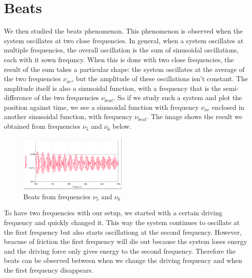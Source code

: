 \documentclass{article}
\begin{document}
\section{Beats}
We then studied the beats phenomenon. This phenomenon is observed when the system oscillates at two close frequencies. In general, when a system oscillates at multiple frequencies, the overall oscillation is the sum of sinusoidal oscillations, each with it sown frequncy. When this is done with two close frequencies, the result of the sum takes a particular shape: the system oscillates at the average of the two frequencies $\nu_{av}$, but the amplitude of these oscillations isn't constant. The amplitude itself is also a sinusoidal function, with a frequency that is the semi-difference of the two frequencies $\nu_{beat}$. So if we study such a system and plot the position against time, we see a sinusoidal function with frequency $\nu_{av}$ enclosed in another sinusoidal function, with frequency $\nu_{beat}$. The image shows the result we obtained from frequencies $\nu_5$ and $\nu_6$ below.

\begin{figure}
  \begin{center}
    \includegraphics[width=0.48\textwidth]{battimenti_vicino_fase}
  \end{center}
  \label{img:beat}
  \caption{Beats from frequencies  $\nu_5$ and $\nu_6$}
\end{figure}

To have two frequencies with our setup, we started with a certain driving frequency and quickly changed it. This way the system continues to oscillate at the first frequency but also starts oscillationg at the second frequency. However, beacuse of friction the first frequency will die out because the system loses energy and the driving force only gives energy to the second frequency. Therefore the beats can be observed between when we change the driving frequency and when the first frequency disappears. 
\end{document}
